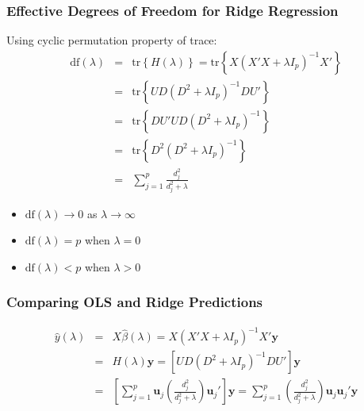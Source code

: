 \begin{frame}
  \frametitle{Effective Degrees of Freedom for Ridge Regression}
 
  Using cyclic permutation property of trace:
  \begin{eqnarray*}
    \mbox{df}(\lambda) &=&  \mbox{tr}\left\{ H(\lambda) \right\} = \mbox{tr}\left\{ X(X'X + \lambda I_p)^{-1}X' \right\}\\
 &=& \mbox{tr}\left\{UD\left( D^2 + \lambda I_p \right)^{-1}DU'\right\}\\
 &=& \mbox{tr}\left\{DU'UD\left( D^2 + \lambda I_p \right)^{-1}\right\}\\
 &=& \mbox{tr}\left\{D^2\left( D^2 + \lambda I_p \right)^{-1}\right\}\\
 &=& \sum_{j=1}^p\frac{d_j^2}{d_j^2 + \lambda}
  \end{eqnarray*}

  \begin{itemize}
    \item $\mbox{df}(\lambda) \rightarrow 0$ as $\lambda \rightarrow \infty$
    \item $\mbox{df}(\lambda) = p$ when $\lambda = 0$
    \item $\mbox{df}(\lambda) < p$ when $\lambda > 0$
  \end{itemize}
\end{frame}
\begin{frame}
  \frametitle{Comparing OLS and Ridge Predictions}

  \begin{eqnarray*}
    \widehat{y}(\lambda) &=&  X\widehat{\beta}(\lambda) = X\left( X'X + \lambda I_p \right)^{-1}X'\mathbf{y} \\
    &=& H(\lambda) \mathbf{y}=  \left[ UD\left( D^2 + \lambda I_p \right)^{-1}DU' \right]\mathbf{y} \\
  &=& \left[ \sum_{j=1}^p \mathbf{u}_j  \left( \frac{d_j^2}{d_j^2 + \lambda} \right)\mathbf{u}_j'\right]\mathbf{y} =  \sum_{j=1}^p   \left( \frac{d_j^2}{d_j^2 + \lambda} \right)\mathbf{u}_j\mathbf{u}_j'\mathbf{y}
  \end{eqnarray*}

\end{frame}
